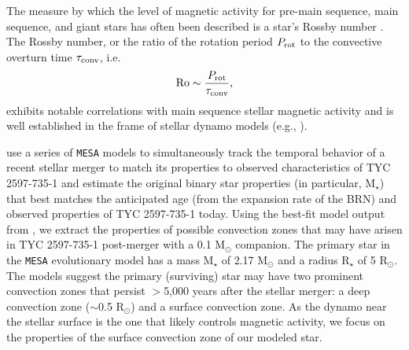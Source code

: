 \documentclass[linenumbers]{aastex631}
\begin{document}
%
The measure by which the level of magnetic activity for pre-main sequence, main sequence, and giant stars has often been described is a star's Rossby number \citep{Preibisch+2005, Pizzolato+2003, Gondoin+2005}.
The Rossby number, or the ratio of the rotation period $P_{\rm rot}$ to the convective overturn time $\tau_{\rm conv}$, i.e.
\begin{equation}
{\rm Ro} \sim \frac{P_{\rm rot}}{\tau_{\rm conv}},
\end{equation}
exhibits notable correlations with main sequence stellar magnetic activity and is well established in the frame of stellar dynamo models (e.g., \citealt{Brandenburg+1998}).

\citet{2020Natur.587..387H} use a series of \texttt{MESA} models to simultaneously track the temporal behavior of a recent stellar merger to match its properties to observed characteristics of TYC 2597-735-1 and estimate the original binary star properties (in particular, M$_{\star}$) that best matches the anticipated age (from the expansion rate of the BRN) and observed properties of TYC 2597-735-1 today. Using the best-fit model output from \citet{2020Natur.587..387H}, we extract the properties of possible convection zones that may have arisen in TYC 2597-735-1 post-merger with a 0.1 M$_{\odot}$ companion. The primary star in the \texttt{MESA} evolutionary model has a mass M$_{\star}$ of 2.17 M$_{\odot}$ and a radius R$_{\star}$ of 5 R$_{\odot}$. The models suggest the primary (surviving) star may have two prominent convection zones that persist $>$5,000 years after the stellar merger: a deep convection zone ($\sim$0.5 R$_{\odot}$) and a surface convection zone. As the dynamo near the stellar surface is the one that likely controls magnetic activity, we focus on the properties of the surface convection zone of our modeled star.
\end{document}
